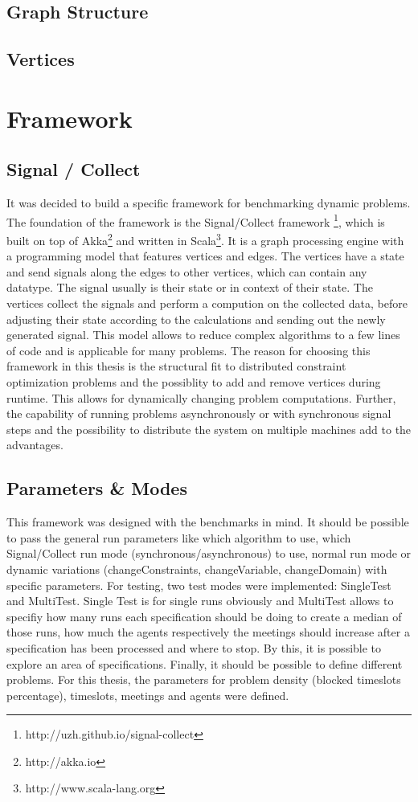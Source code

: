 \subsection{Graph Structure}
\subsection{Vertices}

\section{Framework}

\subsection{Signal / Collect}

It was decided to build a specific framework for benchmarking dynamic problems. The foundation of the framework is the Signal/Collect framework \cite{Stutz2010}\footnote{http://uzh.github.io/signal-collect}, which is built on top of Akka\footnote{http://akka.io} and written in Scala\footnote{http://www.scala-lang.org}. It is a graph processing engine with a programming model that features vertices and edges. The vertices have a state and send signals along the edges to other vertices, which can contain any datatype. The signal usually is their state or in context of their state. The vertices collect the signals and perform a compution on the collected data, before adjusting their state according to the calculations and sending out the newly generated signal.  This model allows to reduce complex algorithms to a few lines of code and is applicable for many problems. The reason for choosing this framework in this thesis is the structural fit to distributed constraint optimization problems and the possiblity to add and remove vertices during runtime. This allows for dynamically changing problem computations. Further, the capability of running problems asynchronously or with synchronous signal steps and the possibility to distribute the system on multiple machines add to the advantages.

\subsection{Parameters \& Modes}
This framework was designed with the benchmarks in mind.  It should be possible to pass the general run parameters like which algorithm to use, which Signal/Collect run mode (synchronous/asynchronous) to use, normal run mode or dynamic variations (changeConstraints, changeVariable, changeDomain) with specific parameters. For testing, two test modes were implemented: SingleTest and MultiTest. Single Test is for single runs obviously and MultiTest allows to specifiy how many runs each specification should be doing to create a median of those runs, how much the agents respectively the meetings should increase after a specification has been processed and where to stop. By this, it is possible to explore an area of specifications. Finally, it should be possible to define different problems. For this thesis, the parameters for problem density (blocked timeslots percentage), timeslots, meetings and agents were defined.

